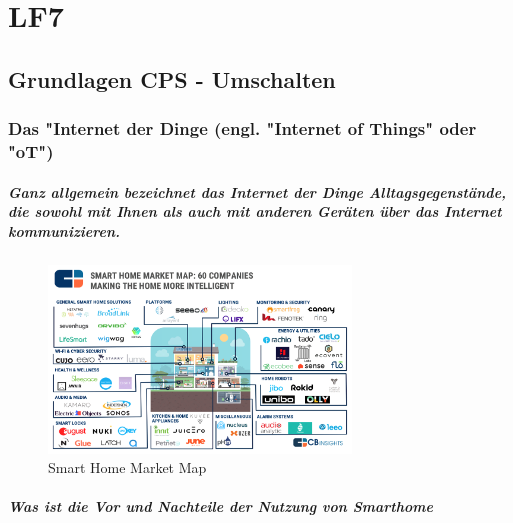 \chapter{\Huge{LF7}}\label{ch:lf7}
\section{Grundlagen CPS - Umschalten}\label{sec:lf7_first_Section}
\subsection{Das "Internet der Dinge (engl. "Internet of Things" oder "oT")}\label{subsec:iot)}
\paragraph{Ganz allgemein bezeichnet das Internet der Dinge Alltagsgegenstände, die sowohl mit Ihnen als auch mit anderen Geräten über das Internet kommunizieren.}
\begin{center}
    \begin{figure}[H]
        \centering
        \includegraphics[height=5cm]{imgs/subjects_media/lf7/iot_startups}
        \caption{Smart Home Market Map}\label{fig:figure}
    \end{figure}
\end{center}

\paragraph{Was ist die Vor und Nachteile der Nutzung von Smarthome}

